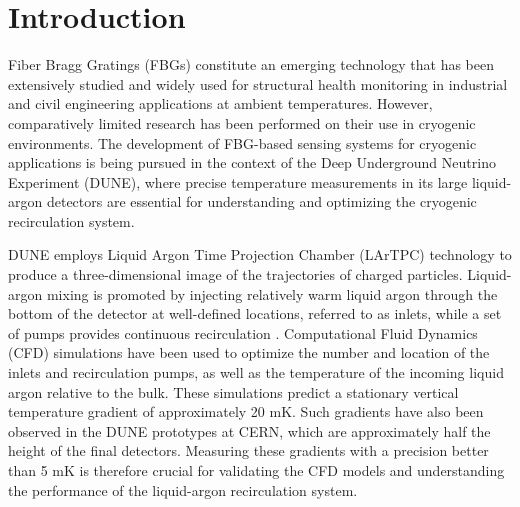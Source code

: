 \documentclass[12pt]{article}
\begin{document}
\tableofcontents


\linenumbers

\section{Introduction}
\label{sec:intro}

Fiber Bragg Gratings (FBGs) constitute an emerging technology that has been extensively studied and widely used for structural health monitoring in industrial and civil engineering applications at ambient temperatures. However, comparatively limited research has been performed on their use in cryogenic environments. 
The development of FBG-based sensing systems for cryogenic applications is being pursued in the context of the Deep Underground Neutrino Experiment (DUNE), where precise temperature measurements in its large liquid-argon detectors are essential for understanding and optimizing the cryogenic recirculation system.

DUNE employs Liquid Argon Time Projection Chamber (LArTPC) technology to produce a three-dimensional image of the trajectories of charged particles. Liquid-argon mixing is promoted by injecting relatively warm liquid argon through the bottom of the detector at well-defined locations, referred to as inlets, while a set of pumps provides continuous recirculation \cite{abi2020deepundergroundneutrinoexperiment, dunecollaboration2023dunefardetectorvertical}. Computational Fluid Dynamics (CFD) simulations have been used to optimize the number and location of the inlets and recirculation pumps, as well as the temperature of the incoming liquid argon relative to the bulk. These simulations predict a stationary vertical temperature gradient of approximately 20 mK. Such gradients have also been observed in the DUNE prototypes at CERN, which are approximately half the height of the final detectors. Measuring these gradients with a precision better than 5 mK is therefore crucial for validating the CFD models and understanding the performance of the liquid-argon recirculation system.

\end{document}
